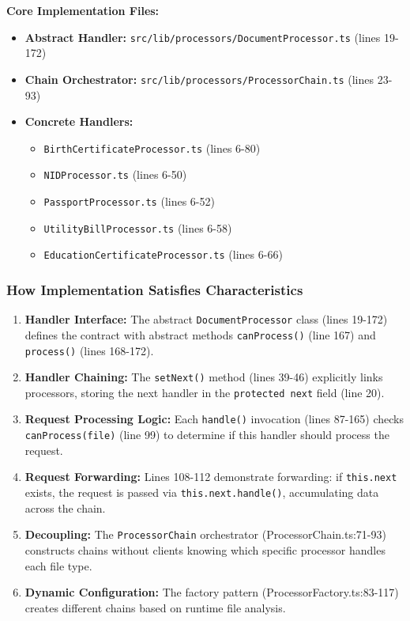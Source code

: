 \documentclass[11pt]{article}
\begin{document}
\textbf{Core Implementation Files:}
\begin{itemize}[noitemsep]
    \item \textbf{Abstract Handler:} \texttt{src/lib/processors/DocumentProcessor.ts} (lines 19-172)
    \item \textbf{Chain Orchestrator:} \texttt{src/lib/processors/ProcessorChain.ts} (lines 23-93)
    \item \textbf{Concrete Handlers:}
    \begin{itemize}[noitemsep]
        \item \texttt{BirthCertificateProcessor.ts} (lines 6-80)
        \item \texttt{NIDProcessor.ts} (lines 6-50)
        \item \texttt{PassportProcessor.ts} (lines 6-52)
        \item \texttt{UtilityBillProcessor.ts} (lines 6-58)
        \item \texttt{EducationCertificateProcessor.ts} (lines 6-66)
    \end{itemize}
\end{itemize}

\subsubsection{How Implementation Satisfies Characteristics}

\begin{enumerate}[noitemsep]
    \item \textbf{Handler Interface:} The abstract \texttt{DocumentProcessor} class (lines 19-172) defines the contract with abstract methods \texttt{canProcess()} (line 167) and \texttt{process()} (lines 168-172).

    \item \textbf{Handler Chaining:} The \texttt{setNext()} method (lines 39-46) explicitly links processors, storing the next handler in the \texttt{protected next} field (line 20).

    \item \textbf{Request Processing Logic:} Each \texttt{handle()} invocation (lines 87-165) checks \texttt{canProcess(file)} (line 99) to determine if this handler should process the request.

    \item \textbf{Request Forwarding:} Lines 108-112 demonstrate forwarding: if \texttt{this.next} exists, the request is passed via \texttt{this.next.handle()}, accumulating data across the chain.

    \item \textbf{Decoupling:} The \texttt{ProcessorChain} orchestrator (ProcessorChain.ts:71-93) constructs chains without clients knowing which specific processor handles each file type.

    \item \textbf{Dynamic Configuration:} The factory pattern (ProcessorFactory.ts:83-117) creates different chains based on runtime file analysis.
\end{enumerate}
\end{document}
